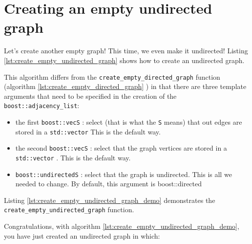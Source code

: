 \section{Creating an empty undirected graph}
\label{subsec:create_empty_undirected_graph}

Let's create another empty graph! This time, we even make it undirected!
Listing \ref{lst:create_empty_undirected_graph}
shows how to create an undirected graph.



This algorithm differs from the \verb;create_empty_directed_graph;
function (algorithm 
\ref{lst:create_empty_directed_graph}
) 
in that there are three template arguments that need to be specified in
the creation of the \verb;boost::adjacency_list;:

\begin{itemize}
  \item the first \verb;boost::vecS; : 
    select (that is what the \verb;S; 
    means) that out edges are stored in a 
    \verb;std::vector; 
    This is the default way.
  \item
    the second \verb;boost::vecS; : 
    select that the graph vertices are stored in a 
    \verb;std::vector; .
    This is the default way.
  \item
    \verb;boost::undirectedS; : 
    select that the graph is undirected.
    This is all we needed to change.
    By default, this argument is boost::directed 
\end{itemize}

Listing \ref{lst:create_empty_undirected_graph_demo}
demonstrates the \verb;create_empty_undirected_graph; function.



Congratulations, with algorithm \ref{lst:create_empty_undirected_graph_demo}, 
you have just created an undirected graph in which:

